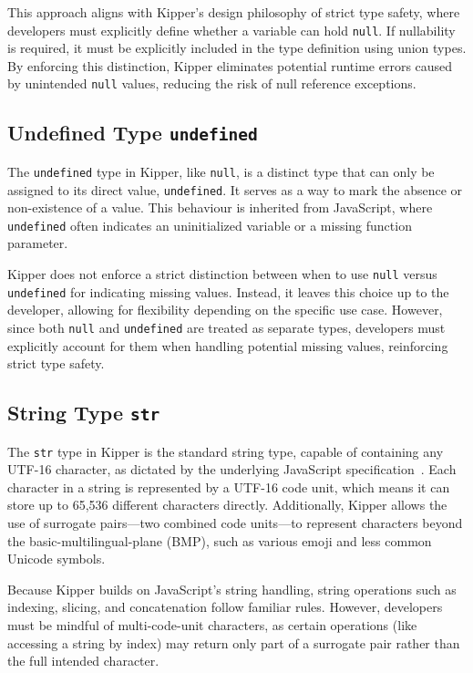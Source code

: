 This approach aligns with Kipper’s design philosophy of strict type safety, where developers must explicitly define whether a variable can hold \lstinline|null|. If nullability is required, it must be explicitly included in the type definition using union types. By enforcing this distinction, Kipper eliminates potential runtime errors caused by unintended \lstinline|null| values, reducing the risk of null reference exceptions.

\subsection{Undefined Type \lstinline|undefined|}

The \lstinline|undefined| type in Kipper, like \lstinline|null|, is a distinct type that can only be assigned to its direct value, \lstinline|undefined|. It serves as a way to mark the absence or non-existence of a value. This behaviour is inherited from JavaScript, where \lstinline|undefined| often indicates an uninitialized variable or a missing function parameter.

Kipper does not enforce a strict distinction between when to use \lstinline|null| versus \lstinline|undefined| for indicating missing values. Instead, it leaves this choice up to the developer, allowing for flexibility depending on the specific use case. However, since both \lstinline|null| and \lstinline|undefined| are treated as separate types, developers must explicitly account for them when handling potential missing values, reinforcing strict type safety.

\subsection{String Type \lstinline|str|}

The \lstinline|str| type in Kipper is the standard string type, capable of containing any UTF-16 character, as dictated by the underlying JavaScript specification~\cite{string-mdn}. Each character in a string is represented by a UTF-16 code unit, which means it can store up to 65,536 different characters directly. Additionally, Kipper allows the use of surrogate pairs—two combined code units—to represent characters beyond the \gls{basic-multilingual-plane} (BMP), such as various emoji and less common Unicode symbols.

Because Kipper builds on JavaScript’s string handling, string operations such as indexing, slicing, and concatenation follow familiar rules. However, developers must be mindful of multi-code-unit characters, as certain operations (like accessing a string by index) may return only part of a surrogate pair rather than the full intended character.

